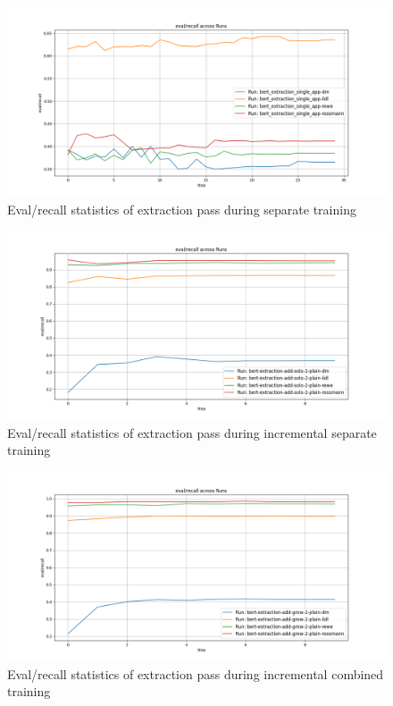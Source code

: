 \documentclass[licencjacka,en]{pracamgr}
\begin{document}
\begin{appendices}
\begin{figure}[ht]
    \centering
    \includegraphics[width=0.8\linewidth]{bachelor_images/bert_ft/e_ers.png}
    \caption{Eval/recall statistics of extraction pass during separate training}
    \label{fig:e_ers}
\end{figure}

\begin{figure}[ht]
    \centering
    \includegraphics[width=0.8\linewidth]{bachelor_images/bert_ft/e_eras.png}
    \caption{Eval/recall statistics of extraction pass during incremental separate training}
    \label{fig:e_eras}
\end{figure}

\begin{figure}[ht]
    \centering
    \includegraphics[width=0.8\linewidth]{bachelor_images/bert_ft/e_erag.png}
    \caption{Eval/recall statistics of extraction pass during incremental combined training}
    \label{fig:e_erag}
\end{figure}


\end{appendices}
\end{document}
